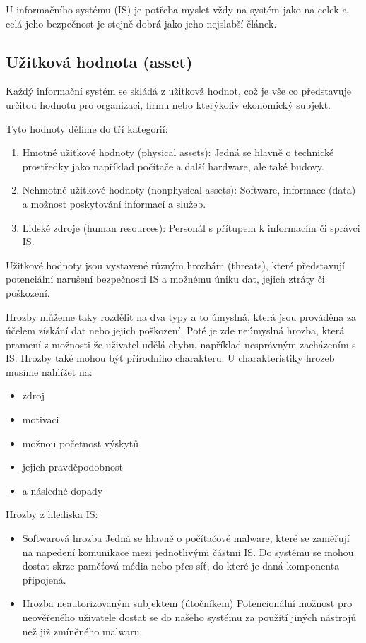 \documentclass{szzclass}
\begin{document}
U informačního systému (IS) je potřeba myslet vždy na systém jako na celek a celá jeho
bezpečnost je stejně dobrá jako jeho nejslabší článek.

\subsection{Užitková hodnota (asset)}

Každý informační systém se skládá z užitkovž hodnot, což je vše co představuje určitou hodnotu pro organizaci, firmu nebo kterýkoliv ekonomický subjekt.

Tyto hodnoty dělíme do tří kategorií:
\begin{enumerate}
    \item Hmotné užitkové hodnoty (physical assets):
          Jedná se hlavně o technické prostředky jako například počítače a další hardware, ale také budovy.
    \item Nehmotné užitkové hodnoty (nonphysical assets):
          Software, informace (data) a možnost poskytování informací a služeb.
    \item Lidské zdroje (human resources):
          Personál s přítupem k informacím či správci IS.
\end{enumerate}

Užitkové hodnoty jsou vystavené různým hrozbám (threats), které představují potenciální narušení bezpečnosti IS a možnému úniku dat, jejich ztráty
či poškození.

Hrozby můžeme taky rozdělit na dva typy a to úmyslná, která jsou prováděna za účelem získání dat nebo jejich poškození. Poté je zde neúmyslná hrozba,
která pramení z možnosti že uživatel udělá chybu, například nesprávným zacházením s IS. Hrozby také mohou být přírodního charakteru.
U charakteristiky hrozeb musíme nahlížet na:
\begin{itemize}
    \item zdroj
    \item motivaci
    \item možnou početnost výskytů
    \item jejich pravděpodobnost
    \item a následné dopady
\end{itemize}

Hrozby z hlediska IS:
\begin{itemize}
    \item Softwarová hrozba
          Jedná se hlavně o počítačové malware, které se zaměřují na napedení komunikace mezi jednotlivými částmi IS. Do systému
          se mohou dostat skrze paměťová média nebo přes síť, do které je daná komponenta připojená.
    \item Hrozba neautorizovaným subjektem (útočníkem)
          Potencionální možnost pro neověřeného uživatele dostat se do našeho systému za použití jiných nástrojů než již zmíněného malwaru.
\end{itemize}
\end{document}
